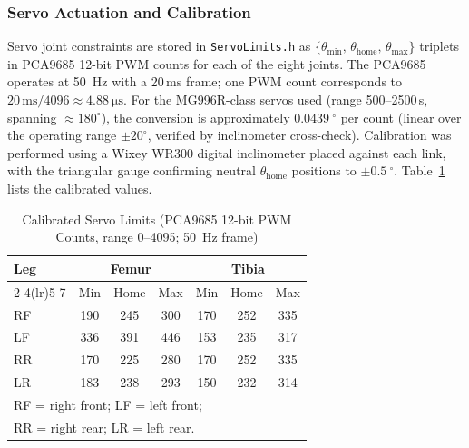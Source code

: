 \documentclass[journal]{IEEEtran}
\newcommand{\dg}{^{\circ}}
\begin{document}
\subsubsection{Servo Actuation and Calibration}
Servo joint constraints are stored in \texttt{ServoLimits.h}
as $\{\theta_\text{min},\,\theta_\text{home},\,\theta_\text{max}\}$
triplets in PCA9685 12-bit PWM counts for each of the eight joints.
The PCA9685 operates at \SI{50}{\hertz} with a 20\,ms frame;
one PWM count corresponds to $20\,\text{ms}/4096 \approx
\SI{4.88}{\micro\second}$.
For the MG996R-class servos used (range 500--2500\,\textmu s,
spanning $\approx180\dg$), the conversion is approximately
$\SI{0.0439}{\dg}$ per count (linear over the operating range
$\pm20\dg$, verified by inclinometer cross-check).
Calibration was performed using a Wixey WR300 digital inclinometer
placed against each link, with the triangular gauge confirming
neutral $\theta_\text{home}$ positions to $\pm\SI{0.5}{\dg}$.
Table~\ref{tab:servolimits} lists the calibrated values.
\begin{table}[!t]
\caption{Calibrated Servo Limits (PCA9685 12-bit PWM Counts,
         range 0--4095; \SI{50}{\hertz} frame)}
\label{tab:servolimits}
\centering
\setlength{\tabcolsep}{4pt}
\begin{tabular}{lcccccc}
\toprule
\multirow{2}{*}{\textbf{Leg}} &
\multicolumn{3}{c}{\textbf{Femur}} &
\multicolumn{3}{c}{\textbf{Tibia}} \\
\cmidrule(lr){2-4}\cmidrule(lr){5-7}
& Min & Home & Max & Min & Home & Max \\
\midrule
RF & 190 & 245 & 300 & 170 & 252 & 335 \\
LF & 336 & 391 & 446 & 153 & 235 & 317 \\
RR & 170 & 225 & 280 & 170 & 252 & 335 \\
LR & 183 & 238 & 293 & 150 & 232 & 314 \\
\bottomrule
\multicolumn{7}{l}{\small RF = right front; LF = left front;} \\
\multicolumn{7}{l}{\small RR = right rear; LR = left rear.}   \\
\end{tabular}
\end{table}
\end{document}
